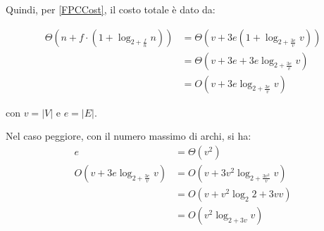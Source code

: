 Quindi, per \eqref{FPCCost}, il costo totale è dato da:

\begin{equation}
    \label{FPC2Cost}
    \begin{aligned}
        \Theta(n+f\cdot (1+\log_{2+\frac{f}{n}}n)) & = \Theta(v + 3e ( 1+\log_{2+\frac{3e}{v}}v)) \\
                                                   & = \Theta(v + 3e + 3e\log_{2+\frac{3e}{v}}v)  \\
                                                   & = O(v + 3e\log_{2+\frac{3e}{v}}v)
    \end{aligned}
\end{equation}

con $v = |V|$ e $e = |E|$.

Nel caso peggiore, con il numero massimo di archi, si ha:
\begin{equation}
    \label{WorstFPC2Cost}
    \begin{aligned}
        e                               & = \Theta(v^2)                         \\
        O(v + 3e\log_{2+\frac{3e}{v}}v) & = O(v + 3v^2\log_{2+\frac{3v^2}{v}}v) \\
                                        & = O(v + v^2\log_2{2+3v}v)             \\
                                        & = O(v^2\log_{2+3v}v)
    \end{aligned}
\end{equation}

